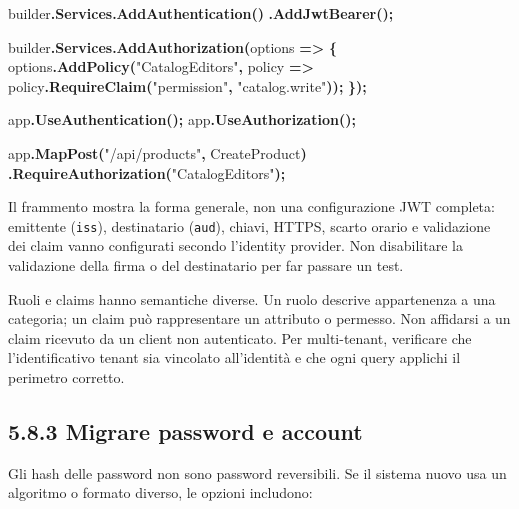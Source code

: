 \documentclass[
  italian,
  10pt,
]{book}
\newenvironment{Shaded}{\begin{snugshade}}{\end{snugshade}}
\newcommand{\FunctionTok}[1]{\textcolor[rgb]{0.13,0.29,0.53}{\textbf{#1}}}
\newcommand{\NormalTok}[1]{#1}
\newcommand{\OperatorTok}[1]{\textcolor[rgb]{0.81,0.36,0.00}{\textbf{#1}}}
\newcommand{\StringTok}[1]{\textcolor[rgb]{0.31,0.60,0.02}{#1}}
\begin{document}
\begin{Shaded}
\begin{Highlighting}[]
\NormalTok{builder}\OperatorTok{.}\FunctionTok{Services}\OperatorTok{.}\FunctionTok{AddAuthentication}\OperatorTok{()}
    \OperatorTok{.}\FunctionTok{AddJwtBearer}\OperatorTok{();}

\NormalTok{builder}\OperatorTok{.}\FunctionTok{Services}\OperatorTok{.}\FunctionTok{AddAuthorization}\OperatorTok{(}\NormalTok{options }\OperatorTok{=\textgreater{}}
\OperatorTok{\{}
\NormalTok{    options}\OperatorTok{.}\FunctionTok{AddPolicy}\OperatorTok{(}\StringTok{"CatalogEditors"}\OperatorTok{,}\NormalTok{ policy }\OperatorTok{=\textgreater{}}
\NormalTok{        policy}\OperatorTok{.}\FunctionTok{RequireClaim}\OperatorTok{(}\StringTok{"permission"}\OperatorTok{,} \StringTok{"catalog.write"}\OperatorTok{));}
\OperatorTok{\});}

\NormalTok{app}\OperatorTok{.}\FunctionTok{UseAuthentication}\OperatorTok{();}
\NormalTok{app}\OperatorTok{.}\FunctionTok{UseAuthorization}\OperatorTok{();}

\NormalTok{app}\OperatorTok{.}\FunctionTok{MapPost}\OperatorTok{(}\StringTok{"/api/products"}\OperatorTok{,}\NormalTok{ CreateProduct}\OperatorTok{)}
   \OperatorTok{.}\FunctionTok{RequireAuthorization}\OperatorTok{(}\StringTok{"CatalogEditors"}\OperatorTok{);}
\end{Highlighting}
\end{Shaded}

Il frammento mostra la forma generale, non una configurazione JWT
completa: emittente (\texttt{iss}), destinatario (\texttt{aud}), chiavi,
HTTPS, scarto orario e validazione dei claim vanno configurati secondo
l'identity provider. Non disabilitare la validazione della firma o del
destinatario per far passare un test.

Ruoli e claims hanno semantiche diverse. Un ruolo descrive appartenenza
a una categoria; un claim può rappresentare un attributo o permesso. Non
affidarsi a un claim ricevuto da un client non autenticato. Per
multi-tenant, verificare che l'identificativo tenant sia vincolato
all'identità e che ogni query applichi il perimetro corretto.

\subsection{5.8.3 Migrare password e
account}\label{migrare-password-e-account}

Gli hash delle password non sono password reversibili. Se il sistema
nuovo usa un algoritmo o formato diverso, le opzioni includono:
\end{document}
